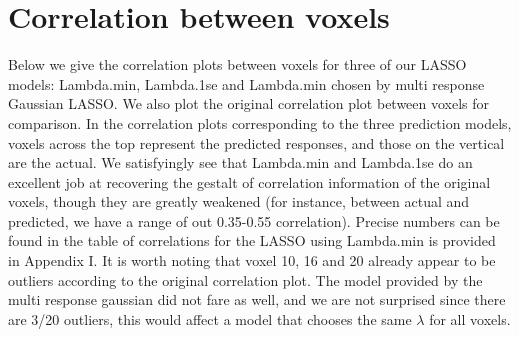 \documentclass[english]{amsart}
\begin{document}
\section{Correlation between voxels} Below we give the correlation plots between voxels for three of our LASSO models:  Lambda.min, Lambda.1se and Lambda.min chosen by multi response Gaussian LASSO.  We also plot the original correlation plot between voxels for comparison.  In the correlation plots corresponding to the three prediction models, voxels across the top represent the predicted responses, and those on the vertical are the actual.  We satisfyingly see that Lambda.min and Lambda.1se do an excellent job at recovering the gestalt of correlation information of the original voxels, though they are greatly weakened (for instance, between actual and predicted, we have a range of out 0.35-0.55 correlation).  Precise numbers can be found in the table of correlations for the LASSO using Lambda.min is provided in Appendix I.  It is worth noting that voxel 10, 16 and 20 already appear to be outliers according to the original correlation plot.  The model provided by the multi response gaussian did not fare as well, and we are not surprised since there are 3/20 outliers, this would affect a model that chooses the same $\lambda$ for all voxels. 
   \\  
\end{document}
